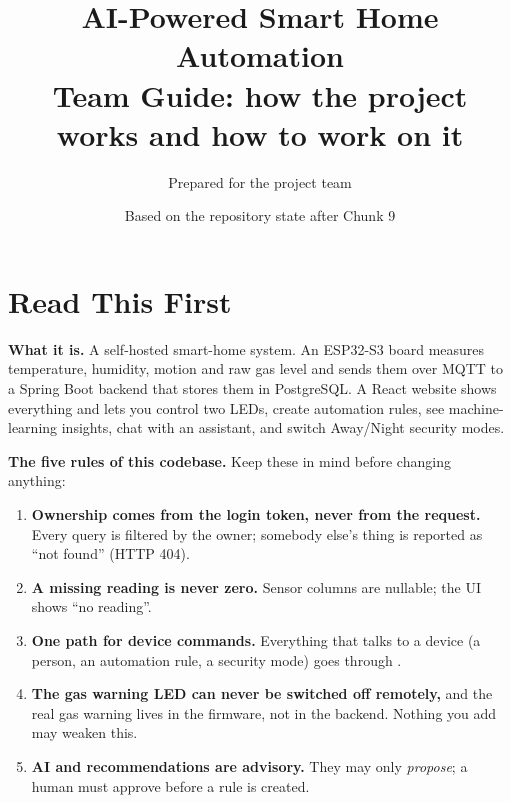 \documentclass[11pt,a4paper]{article}
\title{\textbf{AI-Powered Smart Home Automation}\\[0.3em]\large Team Guide: how the project works and how to work on it}
\author{Prepared for the project team}
\date{Based on the repository state after Chunk 9}
\newcommand{\code}[1]{\texttt{\detokenize{#1}}}
\begin{document}
\maketitle
\tableofcontents
\bigskip

\section{Read This First}
\textbf{What it is.} A self-hosted smart-home system. An ESP32-S3 board measures temperature, humidity, motion and raw gas level and sends them over MQTT to a Spring Boot backend that stores them in PostgreSQL. A React website shows everything and lets you control two LEDs, create automation rules, see machine-learning insights, chat with an assistant, and switch Away/Night security modes.

\textbf{The five rules of this codebase.} Keep these in mind before changing anything:
\begin{enumerate}
  \item \textbf{Ownership comes from the login token, never from the request.} Every query is filtered by the owner; somebody else's thing is reported as ``not found'' (HTTP 404).
  \item \textbf{A missing reading is never zero.} Sensor columns are nullable; the UI shows ``no reading''.
  \item \textbf{One path for device commands.} Everything that talks to a device (a person, an automation rule, a security mode) goes through \code{CommandService}.
  \item \textbf{The gas warning LED can never be switched off remotely,} and the real gas warning lives in the firmware, not in the backend. Nothing you add may weaken this.
  \item \textbf{AI and recommendations are advisory.} They may only \emph{propose}; a human must approve before a rule is created.
\end{enumerate}

\begin{center}
\end{center}
\end{document}
